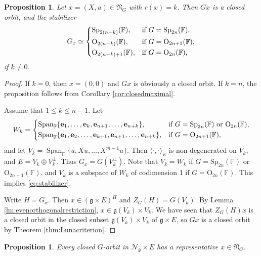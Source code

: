 \documentclass[12pt]{amsart}
\newtheorem{prop}[lm]{Proposition}
\theoremstyle{definition}
\theoremstyle{remark}\newtheorem{rmk}[lm]{Remark}
\newcommand{\CN}{{\mathcal {N}}}
\newcommand{\RO}{{\mathrm {O}}}
\newcommand{\Sp}{{\mathrm{Sp}}}
\newcommand{\Span}{\operatorname{Span}}
\newcommand{\g}{\mathfrak g}
\newcommand{\fN}{\mathfrak N}
\newcommand{\C}{\mathbb{F}}
\newcommand{\be}{\mathbf{e}}
\begin{document}
	\begin{prop}
		\label{prop:closedorbit}
		Let $x=(X,u)\in\fN_{G}$ with $r(x)=k$. Then $Gx$ is a closed orbit, and the stabilizer
		\begin{equation}
			\label{eq:stabilizer}
			G_x\simeq\begin{cases*}
				\Sp_{2(n-k)}(\C),&if $G=\Sp_{2n}(\C)$,\\
				\RO_{2(n-k)}(\C),&if $G=\RO_{2n+1}(\C)$,\\
				\RO_{2(n-k)+1}(\C),& if $G=\RO_{2n}(\C)$,
			\end{cases*}
		\end{equation}
		if $k\neq 0$.
	\end{prop}
	\begin{proof}
		If $k=0$, then $x=(0,0)$ and $Gx$ is obviously a closed orbit. If $k=n$, the proposition follows from Corollary \ref{cor:closedmaximal}.
		
		Assume that $1\leq k\leq n-1$. Let
		\begin{equation}
			\label{eq:subspace}
			W_k=\begin{cases*}
				\Span_{\C}\{\be_1,\dots,\be_k,\be_{n+1},\dots,\be_{n+k}\},&if $G=\Sp_{2n}(\C)$ or $\RO_{2n}(\C)$,\\
				\Span_{\C}\{\be_1,\be_2,\dots,\be_{k+1},\be_{n+1},\dots,\be_{n+k}\},&if $G=\RO_{2n+1}(\C)$,
			\end{cases*}
		\end{equation}
		and let $V_k=\Span_{\C}\{u,Xu,\dots,X^{m-1}u\}$. Then $\langle\cdot,\cdot\rangle_E$ is non-degenerated on $V_k$, and $E=V_k\oplus V_k^{\bot}$. Thus $G_x=G(V_k^{\bot})$. Note that $V_k=W_k$ if $G=\Sp_{2n}(\C)$ or $\RO_{2n+1}(\C)$, and $V_k$ is a subspace of $W_k$ of codimension 1 if $G=\RO_{2n}(\C)$. This implies \eqref{eq:stabilizer}.
		
		Write $H=G_x$. Then $x\in(\g\times E)^H$ and $Z_{G}(H)=G(V_k)$. By Lemma \ref{lm:evenorthogonalrestriction}, $x\in\g(V_k)\times V_k$. We have seen that $Z_{G}(H)x$ is a closed orbit in the closed subset $\g(V_k)\times V_k$ of $\g\times E$, so $Gx$ is a closed orbit by Theorem \ref{thm:Lunacriterion}.
	\end{proof}
	\begin{prop}
		\label{prop:closedorbit2}
		Every closed $G$-orbit in $\CN_{\g}\times E$ has a representative $x\in\fN_{G}$.
	\end{prop}
\end{document}
